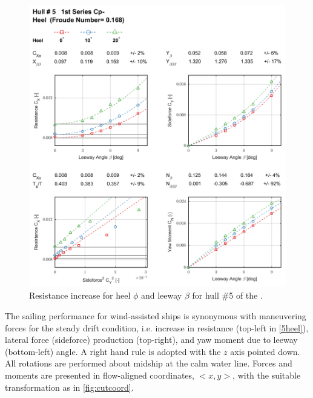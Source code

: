 \documentclass[twoside,twocolumn]{article}
\begin{document}
\begin{figure}[!th]
	\centering
	\includegraphics[width=\textwidth]{images/5heel_process}
	\caption{Resistance increase for heel $\phi$ and leeway $\beta$ for hull \#5 of the \firstseries.}
	\label{fig:5heel}
\end{figure}

The sailing performance for wind-assisted ships is synonymous with maneuvering forces for the steady drift condition, i.e. increase in resistance (top-left in \cref{5heel}), lateral force (sideforce) production (top-right), and yaw moment due to leeway (bottom-left) angle. A right hand rule is adopted with the $z$ axis pointed down. All rotations are performed about midship at the calm water line. Forces and moments are presented in flow-aligned coordinates, $<x,y>$, with the suitable transformation as in \cref{fig:cutcoord}.
\end{document}
